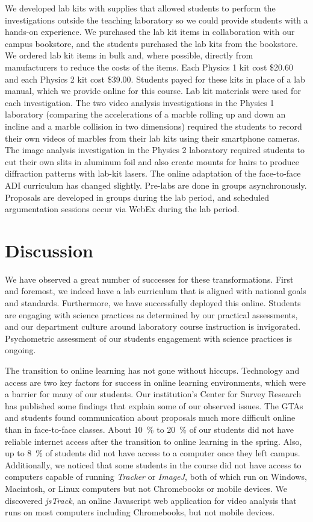 \documentclass[aip, numerical, preprint]{revtex4-2}
\begin{document}
We developed lab kits with supplies that allowed students to perform the investigations outside
the teaching laboratory so we could provide students with a hands-on experience. We purchased
the lab kit items in collaboration with our campus bookstore, and the students purchased the
lab kits from the bookstore. We ordered lab kit items in bulk and, where possible, directly from
manufacturers to reduce the costs of the items. Each Physics 1 kit cost \$20.60 and each
Physics 2 kit cost \$39.00. Students payed for these kits in place of a lab manual, which we
provide online for this course. Lab kit materials were used for each investigation. The two video 
analysis investigations in the Physics 1 laboratory (comparing the accelerations of a marble 
rolling up and down an incline and a marble collision in two dimensions) required the students to 
record their own videos of marbles from their lab kits using their smartphone cameras. The image 
analysis investigation in the 
Physics 2 laboratory required students to cut their own slits in aluminum foil and also create mounts 
for hairs to produce diffraction patterns with lab-kit lasers. The online adaptation of the face-to-face 
ADI curriculum has changed slightly. Pre-labs are done in groups asynchronously.  Proposals are 
developed in groups during the lab period, and scheduled argumentation sessions occur via 
WebEx during the lab period.

\section{Discussion}
We have observed a great number of successes for these transformations.  First and foremost, we
indeed have a lab curriculum that is aligned with national goals and standards. Furthermore, we
have successfully deployed this online.  Students are engaging with science practices as
determined by our practical assessments, and our department culture around laboratory course
instruction is invigorated. Psychometric assessment of our students engagement with science
practices is ongoing.

The transition to online learning has not gone without hiccups.  Technology and access are two
key factors for success in online learning environments, which were a barrier for many of our
students.  Our institution's Center for Survey Research has published some findings that
explain some of our observed issues.\citep{ECUcovidSurveyRedacted} The GTAs and students found
communication about proposals much more difficult online than in face-to-face classes.  About
\SI{10}{\percent} to \SI{20}{\percent} of our students did not have reliable internet access
after the transition to online learning in the spring.\citep{ECUcovidSurveyRedacted} Also, up
to \SI{8}{\percent} of students did not have access to a computer once they left
campus.\citep{ECUcovidSurveyRedacted} Additionally, we noticed that some students in the course
did not have access to computers capable of running \emph{Tracker} or \emph{ImageJ}, both of
which run on Windows, Macintosh, or Linux computers but not Chromebooks or mobile devices. We
discovered \emph{jsTrack}\citep{jstrack}, an online Javascript web application for video
analysis that runs on most computers including Chromebooks, but not mobile devices.
\end{document}
